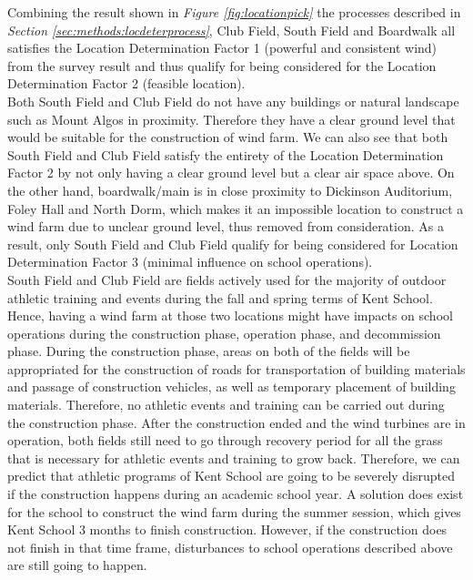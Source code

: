 \documentclass[review]{elsarticle}
\begin{document}
Combining the result shown in \textit{Figure \ref{fig:locationpick}} the processes described in \textit{Section \ref{sec:methods:locdeterprocess}}, 
Club Field, South Field and Boardwalk all satisfies the Location Determination Factor 1 (powerful and consistent wind) from the survey 
result and thus qualify for being considered for the Location Determination Factor 2 (feasible location).  %
\\\indent Both South Field and Club Field do not have any buildings or natural landscape such as Mount Algos in proximity. Therefore 
they have a clear ground level that would be suitable for the construction of wind farm. We can also see that both South Field and Club 
Field satisfy the entirety of the Location Determination Factor 2 by not only having a clear ground level but a clear air space above. 
On the other hand, boardwalk/main is in close proximity to Dickinson Auditorium, Foley Hall and North Dorm, which makes it an impossible 
location to construct a wind farm due to unclear ground level, thus removed from consideration. As a result, only South Field and Club 
Field qualify for being considered for Location Determination Factor 3 (minimal influence on school operations).
\\\indent South Field and Club Field are fields actively used for the majority of outdoor athletic training and events during the fall 
and spring terms of Kent School. Hence, having a wind farm at those two locations might have impacts on school operations during the 
construction phase, operation phase, and decommission phase. During the construction phase, areas on both of the fields will be appropriated 
for the construction of roads for transportation of building materials and passage of construction vehicles, as well as temporary placement 
of building materials. Therefore, no athletic events and training can be carried out during the construction phase. After the construction 
ended and the wind turbines are in operation, both fields still need to go through recovery period for all the grass that is necessary for 
athletic events and training to grow back. Therefore, we can predict that athletic programs of Kent School are going to be severely disrupted 
if the construction happens during an academic school year. A solution does exist for the school to construct the wind farm during the summer 
session, which gives Kent School 3 months to finish construction. However, if the construction does not finish in that time frame, disturbances 
to school operations described above are still going to happen. %
\end{document}
